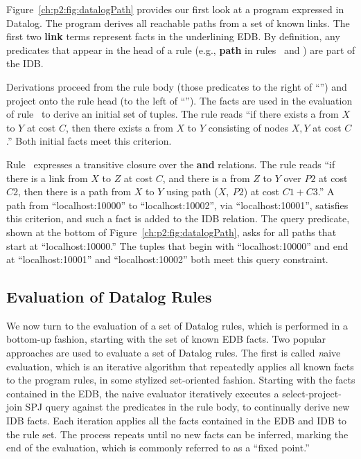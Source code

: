 Figure~\ref{ch:p2:fig:datalogPath} provides our first look at a program
expressed in Datalog.  The program derives all reachable paths from a set of
known links.  The first two {\bf link} terms represent facts in the underlining
EDB.  By definition, any predicates that appear in the head of a rule (e.g.,
{\bf path} in rules~ and ) are part of the IDB.

Derivations proceed from the rule body (those predicates to the right of
``\ol{:-}'') and project onto the rule head (to the left of ``\ol{:-}'').  The
 facts are used in the evaluation of rule~ to derive an initial
set of  tuples.  The rule reads ``if there exists a  from $X$
to $Y$ at cost $C$, then there exists a  from $X$ to $Y$ consisting of
nodes $X, Y$ at cost $C$.'' Both initial facts meet this criterion.

Rule~ expresses a transitive closure over the  {\bf and}
 relations.  The rule reads ``if there is a link from $X$ to $Z$ at cost
$C$, and there is a  from $Z$ to $Y$ over $P2$ at cost $C2$, then
there is a path from $X$ to $Y$ using path ($X,\ P2$) at cost $C1+C3$.'' A path
from ``localhost:10000'' to ``localhost:10002'', via ``localhost:10001'',
satisfies this criterion, and such a fact is added to the  IDB
relation.  The query predicate, shown at the bottom of
Figure~\ref{ch:p2:fig:datalogPath}, asks for all paths that start at
``localhost:10000.'' The  tuples that begin with ``localhost:10000''
and end at ``localhost:10001'' and ``localhost:10002'' both meet this query
constraint.

\subsection{Evaluation of Datalog Rules}

We now turn to the evaluation of a set of Datalog rules, which is performed in
a bottom-up fashion, starting with the set of known EDB facts.  Two popular
approaches are used to evaluate a set of Datalog rules.  The first is called
{\emph naive evaluation}, which is an iterative algorithm that repeatedly
applies all known facts to the program rules, in some stylized set-oriented
fashion.  Starting with the facts contained in the EDB, the naive evaluator
iteratively executes a select-project-join SPJ query against the predicates in
the rule body, to continually derive new IDB facts.  Each iteration applies all
the facts contained in the EDB and IDB to the rule set.  The process repeats
until no new facts can be inferred, marking the end of the evaluation, which
is commonly referred to as a ``fixed point.''

